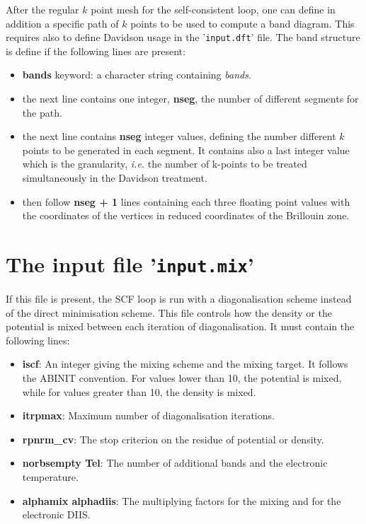 \documentclass[a4paper,11pt]{report}
\begin{document}
After the regular $k$ point mesh for the self-consistent loop, one can
define in addition a specific path of $k$ points to be used to compute
a band diagram. This requires also to define Davidson usage in the
'\texttt{input.dft}' file. The band structure is define if the following lines
are present:
\begin{itemize}
  \item \textbf{bands} keyword: a character string containing
\emph{bands}.
  \item the next line contains one integer, \textbf{nseg}, the number
of different segments for the path.
  \item the next line contains \textbf{nseg} integer values, defining
the number different $k$ points to be generated in each segment. It contains also a last integer value which is the granularity, \textit{i.e.} the number of k-points to be treated simultaneously in the Davidson treatment.
  \item then follow \textbf{nseg + 1} lines containing each three floating
point values with the coordinates of the vertices in reduced
coordinates of the Brillouin zone.
\end{itemize}

\section{The input file '\texttt{input.mix}'}
If this file is present, the SCF loop is run with a diagonalisation scheme instead of the direct minimisation scheme. This file controls how the density or the potential is mixed between each iteration of diagonalisation. It must contain the following lines:
\begin{itemize}
  \item \textbf{iscf}: An integer giving the mixing scheme and the mixing target. It follows the ABINIT convention. For values lower than 10, the potential is mixed, while for values greater than 10, the density is mixed.
  \item \textbf{itrpmax}: Maximum number of diagonalisation iterations.
  \item \textbf{rpnrm\_cv}: The stop criterion on the residue of potential or density.
  \item \textbf{norbsempty Tel}: The number of additional bands and the electronic temperature.
  \item \textbf{alphamix alphadiis}: The multiplying factors for the mixing and for the electronic DIIS.
\end{itemize}
\end{document}
